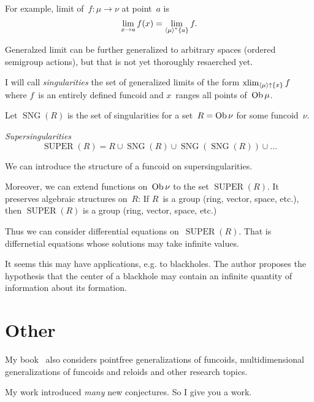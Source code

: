 \documentclass{amsart}
\begin{document}
For example, limit of~$f:\mu\to\nu$ at point~$a$ is
\[ \lim_{x\to a}f(x) = \lim_{\left\langle \mu\right\rangle ^{\ast}\{a\}}f. \]

Generalzed limit can be further generalized to arbitrary spaces
(ordered semigroup actions), but that is not yet thoroughly resaerched yet.

I will call \emph{singularities} the set of generalized limits of the form $\operatorname{xlim}_{\left\langle \mu\right\rangle\uparrow\{x\}}f$ where $f$~is an entirely defined funcoid and $x$~ranges all points of~$\operatorname{Ob}\mu$.

Let $\operatorname{SNG}(R)$ is the set of singularities for
a set~$R=\operatorname{Ob}\nu$ for some funcoid~$\nu$.

\begin{defn}
\emph{Supersingularities}
\[
\operatorname{SUPER}(R) =
R\cup\operatorname{SNG}(R)\cup
\operatorname{SNG}(\operatorname{SNG}(R))\cup\dots
\]
\end{defn}

We can introduce the structure of a funcoid on supersingularities.

Moreover, we can extend functions on~$\operatorname{Ob}\nu$ to the set
$\operatorname{SUPER}(R)$. It preserves algebraic structures
on~$R$: If $R$~is a group (ring, vector, space, etc.), then $\operatorname{SUPER}(R)$ is a group (ring, vector, space, etc.)

Thus we can consider differential equations
on~$\operatorname{SUPER}(R)$. That is differnetial equations
whose solutions may take infinite values.

It seems this may have applications, e.g. to blackholes.
The author proposes the hypothesis that the center of a blackhole
may contain an infinite quantity of information about its
formation.

\section{Other}

My book~\cite{volume-1-edition1} also considers pointfree generalizations of funcoids,
multidimensional generalizations of funcoids and reloids and other research topics.

My work introduced \emph{many} new conjectures. So I give you a work.



\end{document}
